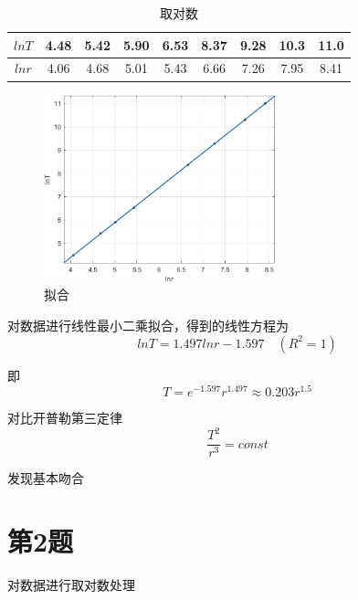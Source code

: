 \documentclass{article}
\begin{document}
\begin{table}[!h]
\begin{center}
\begin{tabular}{|c|c|c|c|c|c|c|c|c|}
    \hline
    $lnT$ & 4.48 & 5.42 & 5.90 & 6.53 & 8.37 & 9.28 & 10.3 & 11.0   \\
    \hline
    $lnr$ & 4.06 & 4.68 & 5.01 & 5.43 & 6.66 & 7.26 & 7.95 & 8.41   \\
    \hline
\end{tabular}
\caption{\label{demo-table}取对数}
\end{center}
\end{table}

\begin{figure}[!h]
    \centering
    \includegraphics[width=0.6\textwidth]{picture/hw4_2.png}
    \caption{拟合}
\end{figure}

对数据进行线性最小二乘拟合，得到的线性方程为
\[lnT = 1.497lnr - 1.597  \quad (R^2 = 1)\]

即
\[T = e^{-1.597}r^{1.497} \approx 0.203r^{1.5}\]

对比开普勒第三定律
\[\frac{T^2}{r^3} = const\]

发现基本吻合

\newpage

\section{第2题}

对数据进行取对数处理
\end{document}
